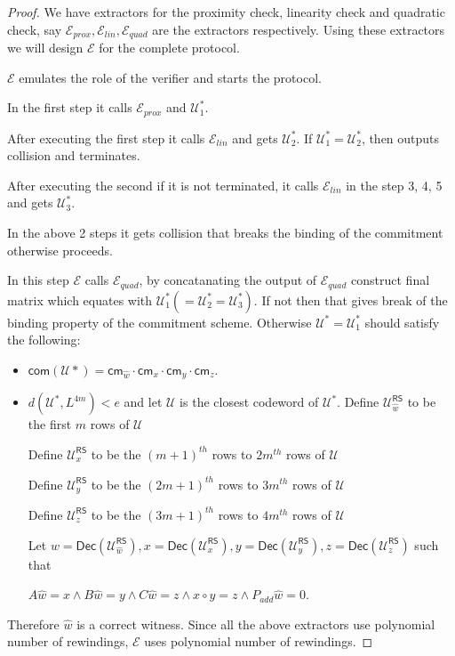 \documentclass[runningheads]{llncs}
\def\extrac{\mathcal{E}}
\def\RS{\mathsf{RS}} %
\def\cm{\mathsf{cm}} %
\def\com{\mathsf{com}} %
\def\extwit{\hat{w}} %
\def\oracle{\mathcal{U}^{\RS}}
\def\dec{\mathsf{Dec}}
\def\calU{\mathcal{U}}
\begin{document}
	\begin{proof}
		We have extractors for the proximity check, linearity check and quadratic check, say $\extrac_{prox}, \extrac_{lin}, \extrac_{quad}$ are the extractors respectively. Using these extractors we will design  $\extrac$ for the complete protocol. 
		
		$\extrac$ emulates the role of the verifier and starts the protocol. 
		
		In the first step it calls $\extrac_{prox}$ and $\calU_1^*$.
		
		After executing the first step it calls $\extrac_{lin}$ and gets $\calU_2^*$. If $\calU_1^* = \calU_2^*$, then outputs collision and terminates.
		
		After executing the second if it is not terminated, it calls $\extrac_{lin}$ in the step 3, 4, 5 and gets $\calU_3^*$. 
		
		In the above 2 steps it gets collision that breaks the binding of the commitment otherwise proceeds.
		
		In this step $\extrac$ calls $\extrac_{quad}$, by concatanating the output of $\extrac_{quad}$ construct final matrix which equates with $\calU_1^* (=\calU_2^*=\calU_3^*)$. If not then that gives break of the binding property of the commitment scheme. Otherwise $\calU^*=\calU_1^*$ should satisfy the following:
		\begin{itemize}
			\item $\com(\calU*)=\cm_{\extwit}\cdot\cm_x\cdot\cm_y\cdot\cm_z$.
			\item $d(\calU^*,L^{4m}) < e$ and let $\calU$ is the closest codeword of $\calU^*$. Define $\oracle_{\extwit}$ to be the first $m$ rows of $\calU$
			
			Define $\oracle_{x}$ to be the $(m+1)^{th}$ rows to $2m^{th}$ rows of $\calU$
			
			Define $\oracle_{y}$ to be the $(2m+1)^{th}$ rows to $3m^{th}$ rows of $\calU$
			
			Define $\oracle_{z}$ to be the $(3m+1)^{th}$ rows to $4m^{th}$ rows of $\calU$
			
			Let $w= \dec(\oracle_{\extwit}), x=\dec(\oracle_x), y=\dec(\oracle_y), z=\dec(\oracle_z)$ such that
			
			$A\extwit = x \wedge B \extwit = y \wedge C \extwit = z \wedge x\circ y =z \wedge P_{add} \extwit = 0$.
		\end{itemize}
		Therefore $\extwit$ is a correct witness. Since all the above extractors use polynomial number of rewindings, $\extrac$ uses polynomial number of rewindings.		
	\end{proof}
\end{document}
